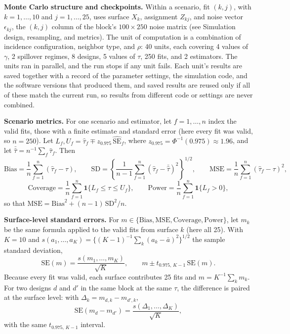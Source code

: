 \documentclass[11pt]{article}
\begin{document}
\textbf{Monte Carlo structure and checkpoints.} Within a scenario, fit
\((k, j)\), with \(k = 1, \dots, 10\) and \(j = 1, \dots, 25\), uses
surface \(X_k\), assignment \(Z_{kj}\), and noise vector
\(\epsilon_{kj}\), the \((k, j)\) column of the block's
\(100 \times 250\) noise matrix (see Simulation design, resampling, and
metrics). The unit of computation is a combination of incidence
configuration, neighbor type, and \(\rho\): 40 units, each covering 4
values of \(\gamma\), 2 spillover regimes, 8 designs, 5 values of
\(\tau\), 250 fits, and 2 estimators. The units ran in parallel, and the
run stops if any unit fails. Each unit's results are saved together with
a record of the parameter settings, the simulation code, and the
software versions that produced them, and saved results are reused only
if all of these match the current run, so results from different code or
settings are never combined.

\textbf{Scenario metrics.} For one scenario and estimator, let
\(f = 1, \dots, n\) index the valid fits, those with a finite estimate
and standard error (here every fit was valid, so \(n = 250\)). Let
\(L_f, U_f = \hat\tau_f \mp z_{0.975}\,\widehat{\text{SE}}_f\), where
\(z_{0.975} = \Phi^{-1}(0.975) \approx 1.96\), and let
\(\bar{\hat\tau} = n^{-1}\sum_f \hat\tau_f\). Then \[
\text{Bias} = \frac{1}{n}\sum_{f=1}^{n}(\hat\tau_f - \tau), \qquad
\text{SD} = \left\{\frac{1}{n-1}\sum_{f=1}^{n}\left(\hat\tau_f - \bar{\hat\tau}\right)^2\right\}^{1/2}, \qquad
\text{MSE} = \frac{1}{n}\sum_{f=1}^{n}(\hat\tau_f - \tau)^2,
\] \[
\text{Coverage} = \frac{1}{n}\sum_{f=1}^{n}\mathbf{1}\{L_f \le \tau \le U_f\}, \qquad
\text{Power} = \frac{1}{n}\sum_{f=1}^{n}\mathbf{1}\{L_f > 0\},
\] so that \(\text{MSE} = \text{Bias}^2 + (n-1)\,\text{SD}^2/n\).

\textbf{Surface-level standard errors.} For
\(m \in \{\text{Bias}, \text{MSE}, \text{Coverage}, \text{Power}\}\),
let \(m_k\) be the same formula applied to the valid fits from surface
\(k\) (here all 25). With \(K = 10\) and
\(s(a_1, \dots, a_K) = \{(K-1)^{-1}\sum_k (a_k - \bar a)^2\}^{1/2}\) the
sample standard deviation, \[
\text{SE}(m) = \frac{s(m_1, \dots, m_K)}{\sqrt{K}}, \qquad m \pm t_{0.975,\,K-1}\,\text{SE}(m).
\] Because every fit was valid, each surface contributes 25 fits and
\(m = K^{-1}\sum_k m_k\). For two designs \(d\) and \(d'\) in the same
block at the same \(\tau\), the difference is paired at the surface
level: with \(\Delta_k = m_{d,k} - m_{d',k}\), \[
\text{SE}(m_d - m_{d'}) = \frac{s(\Delta_1, \dots, \Delta_K)}{\sqrt{K}},
\] with the same \(t_{0.975,\,K-1}\) interval.
\end{document}
